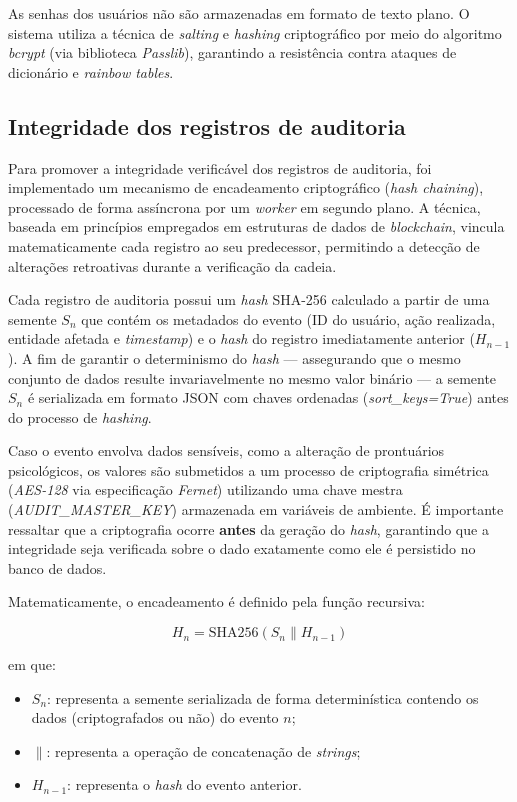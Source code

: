 As senhas dos usuários não são armazenadas em formato de texto plano. O sistema utiliza a técnica de \textit{salting} e \textit{hashing} criptográfico por meio do algoritmo \textit{bcrypt} (via biblioteca \textit{Passlib}), garantindo a resistência contra ataques de dicionário e \textit{rainbow tables}.

\subsection{Integridade dos registros de auditoria}

Para promover a integridade verificável dos registros de auditoria, foi implementado um mecanismo de encadeamento criptográfico (\textit{hash chaining}), processado de forma assíncrona por um \textit{worker} em segundo plano. A técnica, baseada em princípios empregados em estruturas de dados de \textit{blockchain}, vincula matematicamente cada registro ao seu predecessor, permitindo a detecção de alterações retroativas durante a verificação da cadeia.

Cada registro de auditoria possui um \textit{hash} SHA-256 calculado a partir de uma semente $S_n$ que contém os metadados do evento (ID do usuário, ação realizada, entidade afetada e \textit{timestamp}) e o \textit{hash} do registro imediatamente anterior ($H_{n-1}$). A fim de garantir o determinismo do \textit{hash} --- assegurando que o mesmo conjunto de dados resulte invariavelmente no mesmo valor binário --- a semente $S_n$ é serializada em formato JSON com chaves ordenadas (\textit{sort\_keys=True}) antes do processo de \textit{hashing}.

Caso o evento envolva dados sensíveis, como a alteração de prontuários psicológicos, os valores são submetidos a um processo de criptografia simétrica (\textit{AES-128} via especificação \textit{Fernet}) utilizando uma chave mestra (\textit{AUDIT\_MASTER\_KEY}) armazenada em variáveis de ambiente. É importante ressaltar que a criptografia ocorre \textbf{antes} da geração do \textit{hash}, garantindo que a integridade seja verificada sobre o dado exatamente como ele é persistido no banco de dados.

Matematicamente, o encadeamento é definido pela função recursiva:

\[ H_n = \text{SHA256}(S_n \parallel H_{n-1}) \] 

em que:
\begin{itemize}
    \item $S_n$: representa a semente serializada de forma determinística contendo os dados (criptografados ou não) do evento $n$;
    \item $\parallel$: representa a operação de concatenação de \textit{strings};
    \item $H_{n-1}$: representa o \textit{hash} do evento anterior.
\end{itemize}

